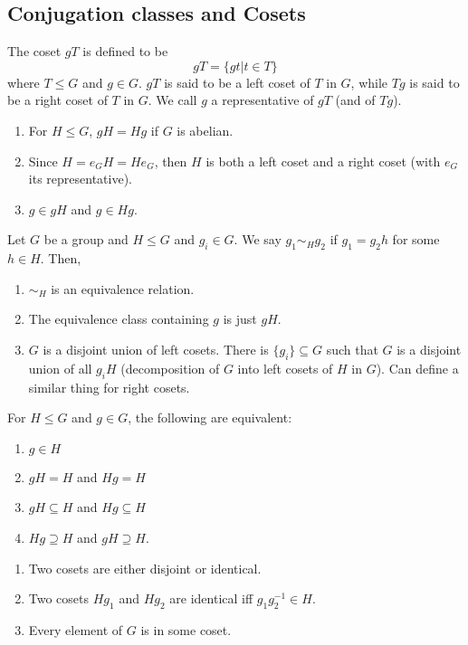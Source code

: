 \documentclass[a4paper]{article}
\begin{document}
\subsection{Conjugation classes and Cosets}
\begin{defi}[Cosets]
The coset $gT$ is defined to be
$$gT=\{gt|t\in T\}$$
where $T\leq G$ and $g\in G$. $gT$ is said to be a left coset of $T$ in $G$, while $Tg$ is said to be a right coset of $T$ in $G$. We call $g$ a representative of $gT$ (and of $Tg$).
\end{defi}
\begin{lemma}\leavevmode
\begin{enumerate}
    \item For $H\leq G$, $gH=Hg$ if $G$ is abelian.
    \item Since $H=e_GH=He_G$, then $H$ is both a left coset and a right coset (with $e_G$ its representative).
    \item $g\in gH$ and $g\in Hg$.
\end{enumerate}
\end{lemma}
\begin{thm}
Let $G$ be a group and $H\leq G$ and $g_i\in G$. We say $g_1\sim_Hg_2$ if $g_1=g_2h$ for some $h\in H$. Then,
\begin{enumerate}
    \item $\sim_H$ is an equivalence relation.
    \item The equivalence class containing $g$ is just $gH$.
    \item $G$ is a disjoint union of left cosets. There is $\{g_i\}\subseteq G$ such that $G$ is a disjoint union of all $g_iH$ (decomposition of $G$ into left cosets of $H$ in $G$). Can define a similar thing for right cosets.
\end{enumerate}
\end{thm}
\begin{cor}
For $H\leq G$ and $g\in G$, the following are equivalent:
\begin{enumerate}
    \item $g\in H$
    \item $gH=H$ and $Hg=H$
    \item $gH\subseteq H$ and $Hg\subseteq H$
    \item $Hg\supseteq H$ and $gH\supseteq H$.
\end{enumerate}
\end{cor}
\begin{thm}\leavevmode
\begin{enumerate}
    \item Two cosets are either disjoint or identical.
    \item Two cosets $Hg_1$ and $Hg_2$ are identical iff $g_1g_2^{-1}\in H$.
    \item Every element of $G$ is in some coset.
\end{enumerate}
\end{thm}
\end{document}
